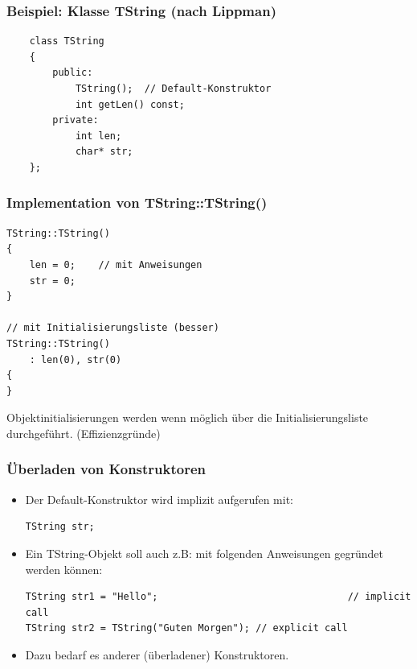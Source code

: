\begin{multicols}{2}
\subsubsection{Beispiel: Klasse TString (nach Lippman)}
\vspace{-\baselineskip}
\begin{minipage}{\linewidth}
	\begin{lstlisting}
	class TString
	{
		public:		
			TString();	// Default-Konstruktor
			int getLen() const;
		private:
			int len;
			char* str;
	};
	\end{lstlisting}	
\end{minipage}
\vfill\null
\columnbreak%
\subsubsection{Implementation von TString::TString()}
\vspace{-\baselineskip}
\begin{minipage}{\linewidth}
\begin{lstlisting}
TString::TString()
{
	len = 0;	// mit Anweisungen
	str = 0;
}

// mit Initialisierungsliste (besser)
TString::TString()
	: len(0), str(0)
{
}
\end{lstlisting}
\end{minipage}
\begin{hinweis}
	Objektinitialisierungen werden wenn möglich über die Initialisierungsliste durchgeführt. (Effizienzgründe)
\end{hinweis}
\end{multicols}

\subsubsection{Überladen von Konstruktoren}
\begin{itemize}
	\item Der Default-Konstruktor wird implizit aufgerufen mit:\\
	\vspace{-\baselineskip}
	\begin{minipage}{0.2\linewidth}
\begin{lstlisting}
TString str;
\end{lstlisting}
	\end{minipage}
	\item Ein TString-Objekt soll auch z.B: mit folgenden Anweisungen gegründet werden können:\\
	\vspace{-\baselineskip}
	\begin{minipage}{0.75\linewidth}
\begin{lstlisting}
TString str1 = "Hello";									// implicit call
TString str2 = TString("Guten Morgen");	// explicit call
\end{lstlisting}
	\end{minipage}
	\item Dazu bedarf es anderer (überladener) Konstruktoren.
\end{itemize}

